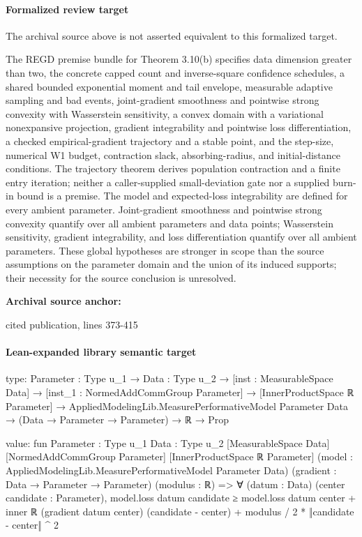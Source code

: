 \documentclass[10pt]{article}
\begin{document}
\paragraph{Formalized review target}
The archival source above is not asserted equivalent to this formalized target.
\begin{ReviewVerbatim}
The REGD premise bundle for Theorem 3.10(b) specifies data dimension greater than two, the concrete capped count and inverse-square confidence schedules, a shared bounded exponential moment and tail envelope, measurable adaptive sampling and bad events, joint-gradient smoothness and pointwise strong convexity with Wasserstein sensitivity, a convex domain with a variational nonexpansive projection, gradient integrability and pointwise loss differentiation, a checked empirical-gradient trajectory and a stable point, and the step-size, numerical W1 budget, contraction slack, absorbing-radius, and initial-distance conditions. The trajectory theorem derives population contraction and a finite entry iteration; neither a caller-supplied small-deviation gate nor a supplied burn-in bound is a premise. The model and expected-loss integrability are defined for every ambient parameter. Joint-gradient smoothness and pointwise strong convexity quantify over all ambient parameters and data points; Wasserstein sensitivity, gradient integrability, and loss differentiation quantify over all ambient parameters. These global hypotheses are stronger in scope than the source assumptions on the parameter domain and the union of its induced supports; their necessity for the source conclusion is unresolved.
\end{ReviewVerbatim}

\textbf{Archival source anchor:} {\footnotesize\raggedright cited publication, lines 373-\allowbreak{}415\par}
\paragraph{Lean-expanded library semantic target}
\begin{ReviewVerbatim}
type:
{Parameter : Type u_1} →
  {Data : Type u_2} →
    [inst : MeasurableSpace Data] →
      [inst_1 : NormedAddCommGroup Parameter] →
        [InnerProductSpace ℝ Parameter] →
          AppliedModelingLib.MeasurePerformativeModel Parameter Data → (Data → Parameter → Parameter) → ℝ → Prop

value:
fun {Parameter : Type u_1} {Data : Type u_2} [MeasurableSpace Data] [NormedAddCommGroup Parameter]
    [InnerProductSpace ℝ Parameter] (model : AppliedModelingLib.MeasurePerformativeModel Parameter Data)
    (gradient : Data → Parameter → Parameter) (modulus : ℝ) =>
  ∀ (datum : Data) (center candidate : Parameter),
    model.loss datum candidate ≥
      model.loss datum center + inner ℝ (gradient datum center) (candidate - center) +
        modulus / 2 * ‖candidate - center‖ ^ 2
\end{ReviewVerbatim}
\end{document}
